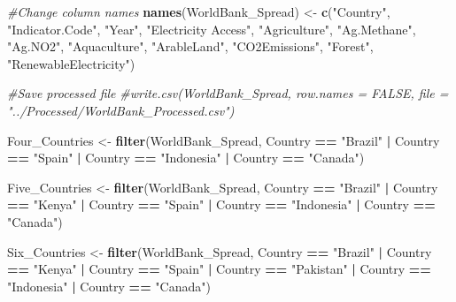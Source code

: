 \documentclass[12pt,]{article}
\newenvironment{Shaded}{\begin{snugshade}}{\end{snugshade}}
\newcommand{\KeywordTok}[1]{\textcolor[rgb]{0.13,0.29,0.53}{\textbf{#1}}}
\newcommand{\StringTok}[1]{\textcolor[rgb]{0.31,0.60,0.02}{#1}}
\newcommand{\CommentTok}[1]{\textcolor[rgb]{0.56,0.35,0.01}{\textit{#1}}}
\newcommand{\OperatorTok}[1]{\textcolor[rgb]{0.81,0.36,0.00}{\textbf{#1}}}
\newcommand{\NormalTok}[1]{#1}
\begin{document}
\begin{Shaded}
\begin{Highlighting}[]
\CommentTok{#Change column names }
\KeywordTok{names}\NormalTok{(WorldBank_Spread) <-}\StringTok{ }\KeywordTok{c}\NormalTok{(}\StringTok{"Country"}\NormalTok{, }\StringTok{"Indicator.Code"}\NormalTok{, }\StringTok{"Year"}\NormalTok{, }\StringTok{"Electricity Access"}\NormalTok{, }\StringTok{"Agriculture"}\NormalTok{, }\StringTok{"Ag.Methane"}\NormalTok{, }\StringTok{"Ag.NO2"}\NormalTok{, }\StringTok{"Aquaculture"}\NormalTok{, }\StringTok{"ArableLand"}\NormalTok{, }\StringTok{"CO2Emissions"}\NormalTok{, }\StringTok{"Forest"}\NormalTok{, }\StringTok{"RenewableElectricity"}\NormalTok{)}

\CommentTok{#Save processed file }
\CommentTok{#write.csv(WorldBank_Spread, row.names = FALSE, file = "../Processed/WorldBank_Processed.csv")}
   
\NormalTok{Four_Countries <-}\StringTok{ }\KeywordTok{filter}\NormalTok{(WorldBank_Spread, Country }\OperatorTok{==}\StringTok{ "Brazil"} \OperatorTok{|}\StringTok{ }\NormalTok{Country }\OperatorTok{==}\StringTok{ "Spain"} \OperatorTok{|}\StringTok{ }\NormalTok{Country }\OperatorTok{==}\StringTok{ "Indonesia"} \OperatorTok{|}\StringTok{ }\NormalTok{Country }\OperatorTok{==}\StringTok{ "Canada"}\NormalTok{)}

\NormalTok{Five_Countries <-}\StringTok{ }\KeywordTok{filter}\NormalTok{(WorldBank_Spread, Country }\OperatorTok{==}\StringTok{ "Brazil"} \OperatorTok{|}\StringTok{ }\NormalTok{Country }\OperatorTok{==}\StringTok{ "Kenya"} \OperatorTok{|}\StringTok{ }\NormalTok{Country }\OperatorTok{==}\StringTok{ "Spain"} \OperatorTok{|}\StringTok{ }\NormalTok{Country }\OperatorTok{==}\StringTok{ "Indonesia"} \OperatorTok{|}\StringTok{ }\NormalTok{Country }\OperatorTok{==}\StringTok{ "Canada"}\NormalTok{)}

\NormalTok{Six_Countries <-}\StringTok{ }\KeywordTok{filter}\NormalTok{(WorldBank_Spread, Country }\OperatorTok{==}\StringTok{ "Brazil"} \OperatorTok{|}\StringTok{ }\NormalTok{Country }\OperatorTok{==}\StringTok{ "Kenya"} \OperatorTok{|}\StringTok{ }\NormalTok{Country }\OperatorTok{==}\StringTok{ "Spain"} \OperatorTok{|}\StringTok{ }\NormalTok{Country }\OperatorTok{==}\StringTok{ "Pakistan"} \OperatorTok{|}\StringTok{ }\NormalTok{Country }\OperatorTok{==}\StringTok{ "Indonesia"} \OperatorTok{|}\StringTok{ }\NormalTok{Country }\OperatorTok{==}\StringTok{ "Canada"}\NormalTok{)}
\end{Highlighting}
\end{Shaded}
\end{document}
